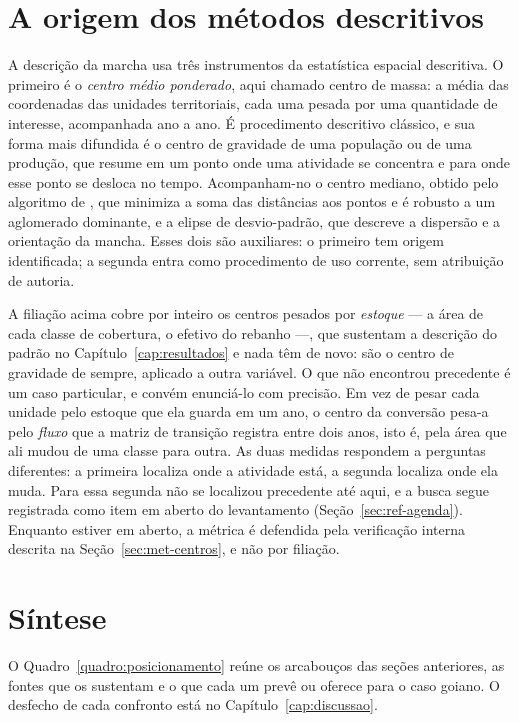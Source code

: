 \section{A origem dos métodos descritivos}
\label{sec:ref-centroide}

A descrição da marcha usa três instrumentos da estatística espacial
descritiva. O primeiro é o \emph{centro médio ponderado}, aqui chamado centro
de massa: a média das coordenadas das unidades territoriais, cada uma pesada
por uma quantidade de interesse, acompanhada ano a ano. É procedimento
descritivo clássico, e sua forma mais difundida é o centro de gravidade de uma
população ou de uma produção, que resume em um ponto onde uma atividade se
concentra e para onde esse ponto se desloca no tempo. Acompanham-no o centro
mediano, obtido pelo algoritmo de , que minimiza a
soma das distâncias aos pontos e é robusto a um aglomerado dominante, e a
elipse de desvio-padrão, que descreve a dispersão e a orientação da mancha.
Esses dois são auxiliares: o primeiro tem origem identificada; a segunda entra
como procedimento de uso corrente, sem atribuição de autoria.

A filiação acima cobre por inteiro os centros pesados por \emph{estoque} --- a
área de cada classe de cobertura, o efetivo do rebanho ---, que sustentam a
descrição do padrão no Capítulo~\ref{cap:resultados} e nada têm de novo: são o
centro de gravidade de sempre, aplicado a outra variável. O que não encontrou
precedente é um caso particular, e convém enunciá-lo com precisão. Em vez de
pesar cada unidade pelo estoque que ela guarda em um ano, o centro da
conversão pesa-a pelo \emph{fluxo} que a matriz de transição registra entre
dois anos, isto é, pela área que ali mudou de uma classe para outra. As duas
medidas respondem a perguntas diferentes: a primeira localiza onde a atividade
está, a segunda localiza onde ela muda. Para essa segunda não se localizou
precedente até aqui, e a busca segue registrada como item em aberto do
levantamento (Seção~\ref{sec:ref-agenda}). Enquanto estiver em aberto, a
métrica é defendida pela verificação interna descrita na
Seção~\ref{sec:met-centros}, e não por filiação.

\section{Síntese}
\label{sec:ref-sintese}

O Quadro~\ref{quadro:posicionamento} reúne os arcabouços das seções
anteriores, as fontes que os sustentam e o que cada um prevê ou oferece para o
caso goiano. O desfecho de cada confronto está no
Capítulo~\ref{cap:discussao}.

